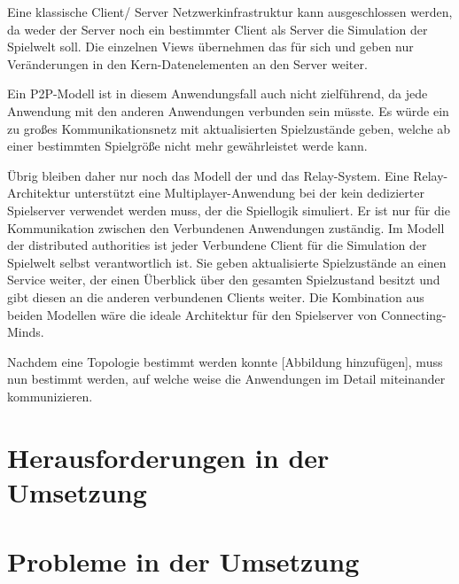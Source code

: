 Eine klassische Client/ Server Netzwerkinfrastruktur kann ausgeschlossen werden, da weder der Server noch ein bestimmter Client als Server die Simulation der Spielwelt soll. Die einzelnen Views übernehmen das für sich und geben nur Veränderungen in den Kern-Datenelementen an den Server weiter. 

Ein \ac{P2P}-Modell ist in diesem Anwendungsfall auch nicht zielführend, da jede Anwendung mit den anderen Anwendungen verbunden sein müsste. Es würde ein zu großes Kommunikationsnetz mit aktualisierten Spielzustände geben, welche ab einer bestimmten Spielgröße nicht mehr gewährleistet werde kann. 

Übrig bleiben daher nur noch das Modell der  und das Relay-System. Eine Relay-Architektur unterstützt eine Multiplayer-Anwendung bei der kein dedizierter Spielserver verwendet werden muss, der die Spiellogik simuliert. Er ist nur für die Kommunikation zwischen den Verbundenen Anwendungen zuständig. Im Modell der distributed authorities ist jeder Verbundene Client für die Simulation der Spielwelt selbst verantwortlich ist. Sie geben aktualisierte Spielzustände an einen Service weiter, der einen Überblick über den gesamten Spielzustand besitzt und gibt diesen an die anderen verbundenen Clients weiter. Die Kombination aus beiden Modellen wäre die ideale Architektur für den Spielserver von Connecting-Minds.

Nachdem eine Topologie bestimmt werden konnte [Abbildung hinzufügen], muss nun bestimmt werden, auf welche weise die Anwendungen im Detail miteinander kommunizieren.



\section{Herausforderungen in der Umsetzung}\label{sec:difficulties}











\section{Probleme in der Umsetzung}



